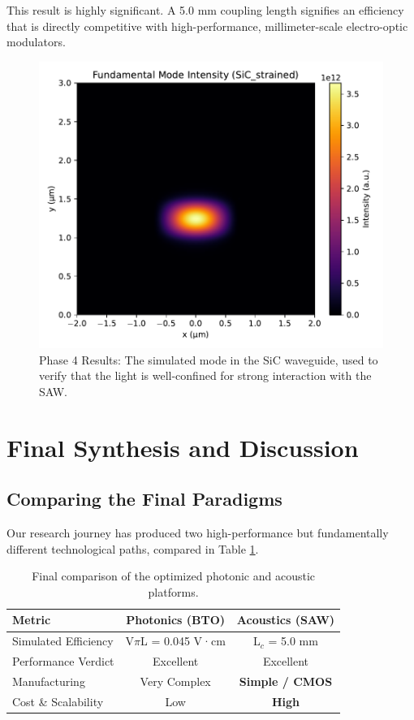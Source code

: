 \documentclass[conference]{IEEEtran} %
\begin{document}
This result is highly significant. A 5.0 mm coupling length signifies an efficiency that is directly competitive with high-performance, millimeter-scale electro-optic modulators.

\begin{figure}[H]
    \centering
    \includegraphics[width=0.8\linewidth]{simulation_v4_mode_SiC_strained.pdf}
    \caption{Phase 4 Results: The simulated mode in the SiC waveguide, used to verify that the light is well-confined for strong interaction with the SAW.}
    \label{fig:sicmode}
\end{figure}

\section{Final Synthesis and Discussion}
\subsection{Comparing the Final Paradigms}
Our research journey has produced two high-performance but fundamentally different technological paths, compared in Table \ref{tab:final_comp}.

\begin{table}[H]
\caption{Final comparison of the optimized photonic and acoustic platforms.}
\label{tab:final_comp}
\centering
\begin{tabular}{lcc}
\toprule
\textbf{Metric} & \textbf{Photonics (BTO)} & \textbf{Acoustics (SAW)} \\
\midrule
Simulated Efficiency & V$\pi$L = 0.045 V·cm & L$_c$ = 5.0 mm \\
Performance Verdict & Excellent & Excellent \\
Manufacturing & Very Complex & \textbf{Simple / CMOS} \\
Cost \& Scalability & Low & \textbf{High} \\
\bottomrule
\end{tabular}
\end{table}
\end{document}
